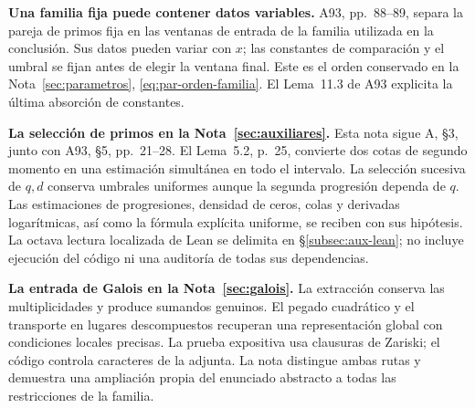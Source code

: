 \textbf{Una familia fija puede contener datos variables.}
A93, pp.~88--89, separa la pareja de primos fija en las ventanas
de entrada de la familia utilizada en la conclusión. Sus datos
pueden variar con $x$; las constantes de comparación y el umbral
se fijan antes de elegir la ventana final. Este es el orden
conservado en la Nota~\ref{sec:parametros},
\eqref{eq:par-orden-familia}. El Lema~11.3 de A93 explicita
la última absorción de constantes.

\textbf{La selección de primos en la Nota~\ref{sec:auxiliares}.}
Esta nota sigue A, §3, junto con A93, §5, pp.~21--28.
El Lema~5.2, p.~25, convierte dos cotas de segundo momento
en una estimación simultánea en todo el intervalo. La selección
sucesiva de $q,d$ conserva umbrales uniformes aunque la segunda
progresión dependa de $q$. Las estimaciones de progresiones,
densidad de ceros, colas y derivadas logarítmicas, así como la
fórmula explícita uniforme, se reciben con sus hipótesis.
La octava lectura localizada de Lean se delimita en
§\ref{subsec:aux-lean}; no incluye ejecución del código ni una
auditoría de todas sus dependencias.

\textbf{La entrada de Galois en la Nota~\ref{sec:galois}.}
La extracción conserva las multiplicidades y produce sumandos
genuinos. El pegado cuadrático y el transporte en lugares
descompuestos recuperan una representación global con condiciones
locales precisas. La prueba expositiva usa clausuras de Zariski;
el código controla caracteres de la adjunta. La nota distingue
ambas rutas y demuestra una ampliación propia del enunciado
abstracto a todas las restricciones de la familia.
